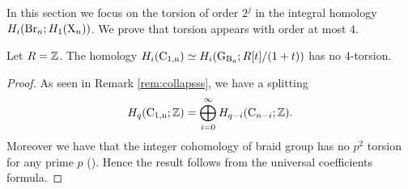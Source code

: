 In this section we focus on the torsion of order $2^j$ in the integral homology $H_{i}(\operatorname{Br}_n; H_1(\mathrm{X}_n))$. 
We prove that torsion appears with order at most $4$. 

\begin{lem} \label{lem:no2tor1}
Let $R = \mathbb{Z}$. The homology $H_i(\operatorname{C_{1,n}}) \simeq H_i(\operatorname{G_{B_{n}}}; R[t]/(1+t))$ has no $4$-torsion.
\end{lem}
\begin{proof}
As seen in Remark \ref{rem:collapsss}, we have a splitting
$$
H_q(\operatorname{C_{1,n}}; \mathbb{Z}) = \bigoplus_{i=0}^\infty H_{q-i} (\operatorname{C}_{n-i}; \mathbb{Z}).
$$ 
Moreover we have that the integer cohomology of braid group has no $p^2$ torsion for any prime $p$ (\cite[Thm.~3]{vain}). Hence the result follows from the universal coefficients formula.
\end{proof}

